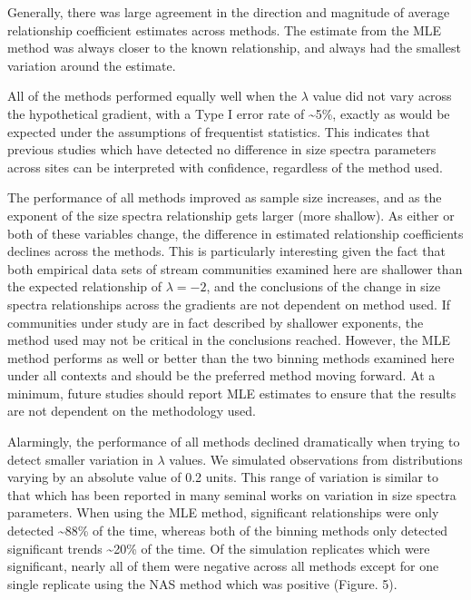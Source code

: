 \documentclass[
]{article}
\begin{document}
Generally, there was large agreement in the direction and magnitude of
average relationship coefficient estimates across methods. The estimate
from the MLE method was always closer to the known relationship, and
always had the smallest variation around the estimate.

All of the methods performed equally well when the \(\lambda\) value did
not vary across the hypothetical gradient, with a Type I error rate of
\textasciitilde5\%, exactly as would be expected under the assumptions
of frequentist statistics. This indicates that previous studies which
have detected no difference in size spectra parameters across sites can
be interpreted with confidence, regardless of the method used.

The performance of all methods improved as sample size increases, and as
the exponent of the size spectra relationship gets larger (more
shallow). As either or both of these variables change, the difference in
estimated relationship coefficients declines across the methods. This is
particularly interesting given the fact that both empirical data sets of
stream communities examined here are shallower than the expected
relationship of \(\lambda = -2\), and the conclusions of the change in
size spectra relationships across the gradients are not dependent on
method used. If communities under study are in fact described by
shallower exponents, the method used may not be critical in the
conclusions reached. However, the MLE method performs as well or better
than the two binning methods examined here under all contexts and should
be the preferred method moving forward. At a minimum, future studies
should report MLE estimates to ensure that the results are not dependent
on the methodology used.

Alarmingly, the performance of all methods declined dramatically when
trying to detect smaller variation in \(\lambda\) values. We simulated
observations from distributions varying by an absolute value of 0.2
units. This range of variation is similar to that which has been
reported in many seminal works on variation in size spectra parameters.
When using the MLE method, significant relationships were only detected
\textasciitilde88\% of the time, whereas both of the binning methods
only detected significant trends \textasciitilde20\% of the time. Of the
simulation replicates which were significant, nearly all of them were
negative across all methods except for one single replicate using the
NAS method which was positive (Figure. 5).
\end{document}
